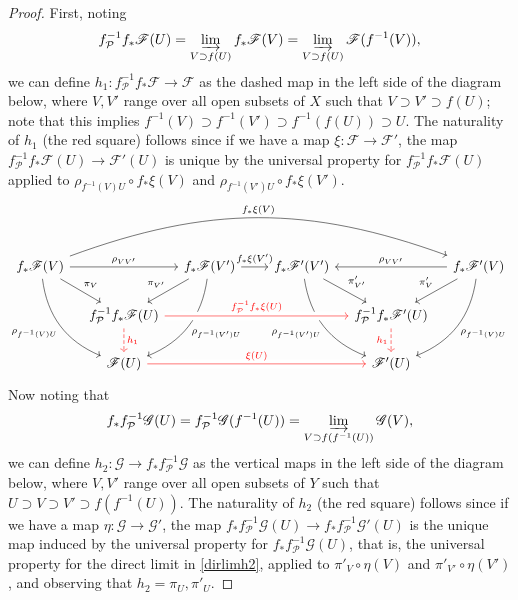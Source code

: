 \documentclass[12pt,letterpaper]{article}
\theoremstyle{definition}
\theoremstyle{remark}
\numberwithin{equation}{section}
\numberwithin{figure}{problem}
\begin{document}
\begin{proof}
  First, noting
  \begin{equation*}
    f_\mathcal{P}^{-1}f_*\mathscr{F}(U) = \varinjlim_{V \supset f(U)} f_*\mathscr{F}(V) = \varinjlim_{V \supset f(U)} \mathscr{F}(f^{-1}(V)),
  \end{equation*}
  we can define $h_1\colon f^{-1}_\mathcal{P}f_*\mathscr{F} \to \mathscr{F}$ as the dashed map in the left side of the diagram below, where $V,V'$ range over all open subsets of $X$ such that $V \supset V' \supset f(U)$; note that this implies $f^{-1}(V) \supset f^{-1}(V') \supset f^{-1}(f(U)) \supset U$. The naturality of $h_1$ (the red square) follows since if we have a map $\xi\colon \mathscr{F} \to \mathscr{F}'$, the map $f_\mathcal{P}^{-1}f_*\mathscr{F}(U) \to \mathscr{F}'(U)$ is unique by the universal property for $f_\mathcal{P}^{-1}f_*\mathscr{F}(U)$ applied to $\rho_{f^{-1}(V)U} \circ f_*\xi(V)$ and $\rho_{f^{-1}(V')U} \circ f_*\xi(V')$.
  \begin{equation*}
    \begin{tikzcd}[column sep=2.4ex]
      f_*\mathscr{F}(V) \arrow[bend left=20]{rrrrrr}{f_*\xi(V)}\arrow{rr}{\rho_{VV'}}\arrow{dr}{\pi_V}\arrow[bend right]{ddr}[swap]{\rho_{f^{-1}(V)U}} & & f_*\mathscr{F}(V')\arrow{rr}{f_*\xi(V')}\arrow{dl}[swap]{\pi_{V'}}\arrow[bend left]{ddl}{\rho_{f^{-1}(V')U}} & & f_*\mathscr{F}'(V')\arrow{dr}{\pi'_{V'}}\arrow[bend right]{ddr}[swap]{\rho_{f^{-1}(V')U}} & & f_*\mathscr{F}'(V)\arrow{ll}[swap]{\rho_{VV'}}\arrow{dl}[swap]{\pi'_V}\arrow[bend left]{ddl}{\rho_{f^{-1}(V)U}}\\
      & f^{-1}_\mathcal{P}f_*\mathscr{F}(U)\arrow[red,crossing over]{rrrr}{f_\mathcal{P}^{-1}f_*\xi(U)}\dar[red,dashed]{h_1} & & & & f^{-1}_\mathcal{P}f_*\mathscr{F}'(U)\dar[red,dashed,swap]{h_1}\\
      & \mathscr{F}(U) \arrow[red,crossing over]{rrrr}{\xi(U)} & & & & \mathscr{F}'(U)
    \end{tikzcd}
  \end{equation*}
  Now noting that
  \begin{equation}\label{dirlimh2}
    f_*f^{-1}_\mathcal{P}\mathscr{G}(U) = f^{-1}_\mathcal{P}\mathscr{G}(f^{-1}(U)) = \varinjlim_{V \supset f(f^{-1}(U))} \mathscr{G}(V),
  \end{equation}
  we can define $h_2\colon\mathscr{G} \to f_*f^{-1}_\mathcal{P}\mathscr{G}$ as the vertical maps in the left side of the diagram below, where $V,V'$ range over all open subsets of $Y$ such that $U \supset V \supset V' \supset f(f^{-1}(U))$. The naturality of $h_2$ (the red square) follows since if we have a map $\eta\colon \mathscr{G} \to \mathscr{G}'$, the map $f_*f_\mathcal{P}^{-1}\mathscr{G}(U) \to f_*f_\mathcal{P}^{-1}\mathscr{G}'(U)$ is the unique map induced by the universal property for $f_*f_\mathcal{P}^{-1}\mathscr{G}(U)$, that is, the universal property for the direct limit in \eqref{dirlimh2}, applied to $\pi'_V \circ \eta(V)$ and $\pi'_{V'} \circ \eta(V')$, and observing that $h_2 = \pi_U,\pi'_U$.

\end{proof}
\end{document}
